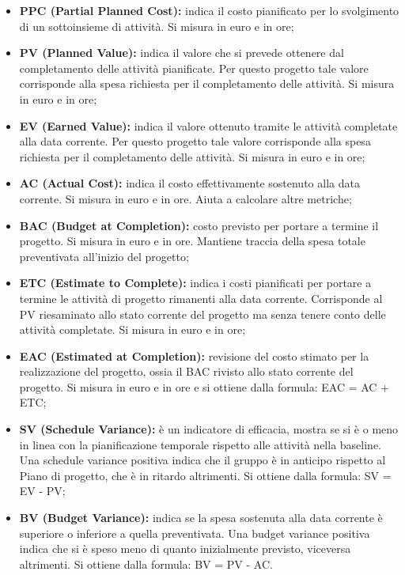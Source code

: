 		\begin{itemize}
			\item \textbf{PPC (Partial Planned Cost): }indica il costo pianificato per lo svolgimento di un sottoinsieme di attività. Si misura in euro e in ore;
			\item \textbf{PV (Planned Value): }indica il valore che si prevede ottenere dal completamento delle attività pianificate. Per questo progetto tale valore corrisponde alla spesa richiesta per il completamento delle attività. Si misura in euro e in ore;
			\item \textbf{EV (Earned Value): }indica il valore ottenuto tramite le attività completate alla data corrente. Per questo progetto tale valore corrisponde alla spesa richiesta per il completamento delle attività. Si misura in euro e in ore;
			\item \textbf{AC (Actual Cost): }indica il costo effettivamente sostenuto alla data corrente. Si misura in euro e in ore. Aiuta a calcolare altre metriche;
			\item \textbf{BAC (Budget at Completion): }costo previsto per portare a termine il progetto. Si misura in euro e in ore. Mantiene traccia della spesa totale preventivata all'inizio del progetto;
			\item \textbf{ETC (Estimate to Complete): }indica i costi pianificati per portare a termine le attività di progetto rimanenti alla data corrente. Corrisponde al PV riesaminato allo stato corrente del progetto ma senza tenere conto delle attività completate. Si misura in euro e in ore;
			\item \textbf{EAC (Estimated at Completion): }revisione del costo stimato per la realizzazione del progetto, ossia il BAC rivisto allo stato corrente del progetto. Si misura in euro e in ore e si ottiene dalla formula: EAC = AC + ETC;
			\item \textbf{SV (Schedule Variance): }è un indicatore di efficacia, mostra se si è o meno in linea con la pianificazione temporale rispetto alle attività nella baseline. Una schedule variance positiva indica che il gruppo è in anticipo rispetto al Piano di progetto, che è in ritardo altrimenti. Si ottiene dalla formula: SV = EV - PV;
			\item \textbf{BV (Budget Variance): }indica se la spesa sostenuta alla data corrente è superiore o inferiore a quella preventivata. Una budget variance positiva indica che si è speso meno di quanto inizialmente previsto, viceversa altrimenti. Si ottiene dalla formula: BV = PV - AC.
			
		\end{itemize}
		
